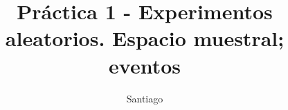 \documentclass{article}
\title{Práctica 1 - Experimentos aleatorios. Espacio muestral; eventos}
\author{Santiago}
\date{}
\begin{document}
    \maketitle
    \begin{enumerate}
        
        
        
        
        
        
        
        
        
        
        
        
        
        
        
        
        
        
        
        
        
        
        
    \end{enumerate}
\end{document}
